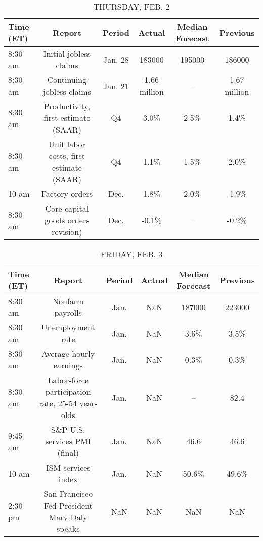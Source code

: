 \documentclass{article}%
\begin{document}
\begin{table}[htbp]%
\caption{THURSDAY, FEB. 2}%
\centering%
\begin{adjustbox}{width=1\textwidth}%
\begin{tabular}{lccccc}
\toprule
Time (ET) &                                  Report &  Period &       Actual & Median Forecast &     Previous \\
\midrule
  8:30 am &                  Initial jobless claims & Jan. 28 &       183000 &          195000 &       186000 \\
  8:30 am &               Continuing jobless claims & Jan. 21 & 1.66 million &              -- & 1.67 million \\
  8:30 am &     Productivity, first estimate (SAAR) &      Q4 &         3.0\% &            2.5\% &         1.4\% \\
  8:30 am & Unit labor costs, first estimate (SAAR) &      Q4 &         1.1\% &            1.5\% &         2.0\% \\
    10 am &                          Factory orders &    Dec. &         1.8\% &            2.0\% &        -1.9\% \\
  8:30 am &     Core capital goods orders revision) &    Dec. &        -0.1\% &              -- &        -0.2\% \\
\bottomrule
\end{tabular}
%
\end{adjustbox}%
\end{table}

%


\begin{table}[htbp]%
\caption{FRIDAY, FEB. 3}%
\centering%
\begin{adjustbox}{width=1\textwidth}%
\begin{tabular}{lccccc}
\toprule
Time (ET) &                                          Report & Period & Actual & Median Forecast & Previous \\
\midrule
  8:30 am &                                Nonfarm payrolls &   Jan. &    NaN &          187000 &   223000 \\
  8:30 am &                               Unemployment rate &   Jan. &    NaN &            3.6\% &     3.5\% \\
  8:30 am &                         Average hourly earnings &   Jan. &    NaN &            0.3\% &     0.3\% \\
  8:30 am & Labor-force participation rate, 25-54 year-olds &   Jan. &    NaN &              -- &     82.4 \\
  9:45 am &                   S\&P U.S. services PMI (final) &   Jan. &    NaN &            46.6 &     46.6 \\
    10 am &                              ISM services index &   Jan. &    NaN &           50.6\% &    49.6\% \\
  2:30 pm &    San Francisco Fed President Mary Daly speaks &    NaN &    NaN &             NaN &      NaN \\
\bottomrule
\end{tabular}
%
\end{adjustbox}%
\end{table}
\end{document}
